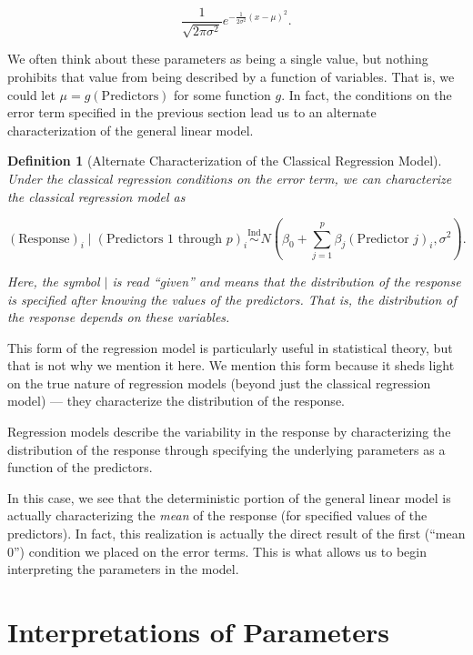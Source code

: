 \documentclass[
]{book}
\theoremstyle{plain}
\theoremstyle{mydefn}
\newtheorem{definition}{Definition}[chapter]
\theoremstyle{myexmpl}
\theoremstyle{remark}
\begin{document}
\[\frac{1}{\sqrt{2\pi\sigma^2}} e^{-\frac{1}{2\sigma^2}\left(x - \mu\right)^2}.\]

We often think about these parameters as being a single value, but nothing prohibits that value from being described by a function of variables. That is, we could let \(\mu = g(\text{Predictors})\) for some function \(g\). In fact, the conditions on the error term specified in the previous section lead us to an alternate characterization of the general linear model.

\begin{definition}[Alternate Characterization of the Classical Regression Model]
Under the classical regression conditions on the error term, we can characterize the classical regression model as

\[(\text{Response})_i \mid (\text{Predictors 1 through } p)_i \stackrel{\text{Ind}}{\sim}N\left(\beta_0 + \sum\limits_{j=1}^{p} \beta_j (\text{Predictor } j)_i, \sigma^2\right).\]

Here, the symbol \(\mid\) is read ``given'' and means that the distribution of the response is specified after knowing the values of the predictors. That is, the distribution of the response depends on these variables.
\end{definition}

This form of the regression model is particularly useful in statistical theory, but that is not why we mention it here. We mention this form because it sheds light on the true nature of regression models (beyond just the classical regression model) --- they characterize the distribution of the response.

\begin{rmdkeyidea}
Regression models describe the variability in the response by characterizing the distribution of the response through specifying the underlying parameters as a function of the predictors.
\end{rmdkeyidea}

In this case, we see that the deterministic portion of the general linear model is actually characterizing the \emph{mean} of the response (for specified values of the predictors). In fact, this realization is actually the direct result of the first (``mean 0'') condition we placed on the error terms. This is what allows us to begin interpreting the parameters in the model.

\hypertarget{interpretations-of-parameters}{%
\section{Interpretations of Parameters}\label{interpretations-of-parameters}}
\end{document}
